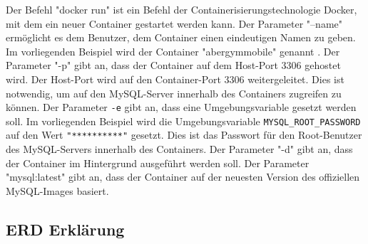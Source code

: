 Der Befehl "docker run" ist ein Befehl der Containerisierungstechnologie Docker, mit dem ein neuer Container gestartet werden kann. Der Parameter "--name" ermöglicht es dem Benutzer, dem Container einen eindeutigen Namen zu geben. Im vorliegenden Beispiel wird der Container "abergymmobile" genannt \cite{MySQLDocker}.
\newline
\newline
Der Parameter "-p" gibt an, dass der Container auf dem Host-Port 3306 gehostet wird. Der Host-Port wird auf den Container-Port 3306 weitergeleitet. Dies ist notwendig, um auf den MySQL-Server innerhalb des Containers zugreifen zu können.
\newline
\newline
Der Parameter \verb|-e| gibt an, dass eine Umgebungsvariable gesetzt werden soll. Im vorliegenden Beispiel wird die Umgebungsvariable \verb|MYSQL_ROOT_PASSWORD| auf den Wert \verb|"**********"| gesetzt. Dies ist das Passwort für den Root-Benutzer des MySQL-Servers innerhalb des Containers.
\newline
\newline
Der Parameter "-d" gibt an, dass der Container im Hintergrund ausgeführt werden soll. Der Parameter "mysql:latest" gibt an, dass der Container auf der neuesten Version des offiziellen MySQL-Images basiert.
\newpage
\subsection{ERD Erklärung}

